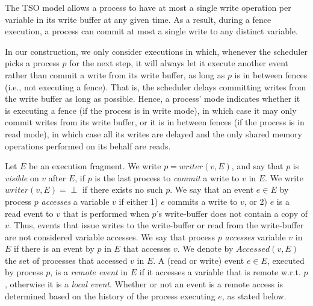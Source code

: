 The TSO model allows a process to have at most a single write operation per variable in its write buffer at any given time. As a result, during a fence execution,
a process can commit at most a single write to any distinct variable.

In our construction, we only consider executions in which, whenever the scheduler picks a process $p$ for the next step,
it will always let it execute another event rather than commit a write from its write buffer,
as long as $p$ is in between fences (i.e., not executing a fence). That is, the scheduler delays committing writes
from the write buffer as long as possible. Hence, a process' mode indicates whether it is executing a fence
(if the process is in write mode), in which case it may only commit writes from its write buffer,
or it is in between fences (if the process is in read mode), in which case all its writes are delayed
and the only shared memory operations performed on its behalf are reads.

Let $E$ be an execution fragment. We write $p = writer(v,E)$, and say that $p$ is \emph{visible} on $v$ after $E$, if $p$ is the last process
to \emph{commit} a write to $v$ in $E$. We write $writer(v,E) = \perp$ if there exists no such $p$.
We say that an event $e \in E$ by process $p$ \emph{accesses} a variable $v$ if either 1) $e$ commits a write to $v$,
or 2) $e$ is a read event to $v$ that is performed when $p$'s write-buffer does not contain a copy of $v$.
Thus, events that issue writes to the write-buffer or read from
the write-buffer are not considered variable accesses.
We say that process $p$ \emph{accesses} variable $v$ in $E$ if there is an event by $p$ in $E$ that accesses $v$.
We denote by $Accessed(v,E)$ the set of processes that accessed $v$ in $E$.
A (read or write) event $e \in E$, executed by process $p$, is a \emph{remote event} in $E$ if it accesses a variable that
is remote w.r.t.
$p$, otherwise it is a \emph{local event}. Whether or not an event is a remote access is determined based on the history
of the process executing $e$, as stated below.

